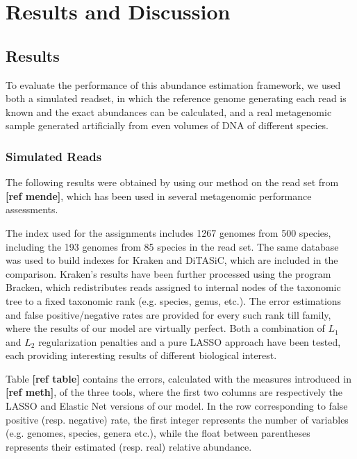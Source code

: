 
\chapter{Results and Discussion}
\label{Chapter4}

\section{Results}

To evaluate the performance of this abundance estimation framework, we used both a simulated readset, in which the reference genome generating each read is known and the exact abundances can be calculated, and a real metagenomic sample generated artificially from even volumes of DNA of different species.

\subsection{Simulated Reads}

The following results were obtained by using our method on the read set from \textbf{[ref mende]}, which has been used in several metagenomic performance assessments.

The index used for the assignments includes 1267 genomes from 500 species, including the 193 genomes from 85 species in the read set. The same database was used to build indexes for Kraken and DiTASiC, which are included in the comparison. Kraken's results have been further processed using the program Bracken, which redistributes reads assigned to internal nodes of the taxonomic tree to a fixed taxonomic rank (e.g. species, genus, etc.). The error estimations and false positive/negative rates are provided for every such rank till family, where the results of our model are virtually perfect. Both a combination of $L_1$ and $L_2$ regularization penalties and a pure LASSO approach have been tested, each providing interesting results of different biological interest.

Table \textbf{[ref table]} contains the errors, calculated with the measures introduced in \textbf{[ref meth]}, of the three tools, where the first two columns are respectively the LASSO and Elastic Net versions of our model. In the row corresponding to false positive (resp. negative) rate, the first integer represents the number of variables (e.g. genomes, species, genera etc.), while the float between parentheses represents their estimated (resp. real) relative abundance.

